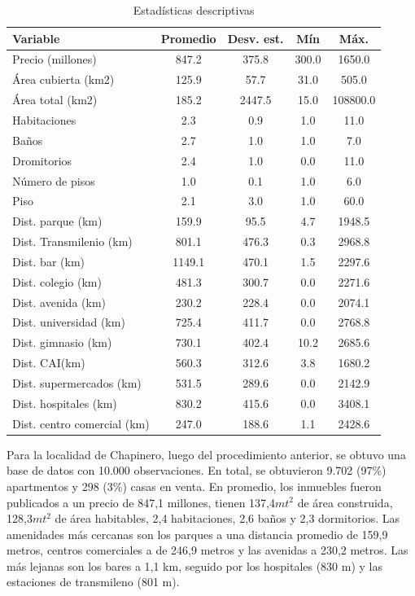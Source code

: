 \documentclass[
  11pt,
  letterpaper,
]{article}
\begin{document}
\begin{table}[!h]
\centering
\caption{\label{tab:descriptive-tbl}Estadísticas descriptivas}
\centering
\begin{tabular}[t]{l|c|c|c|c}
\hline
Variable & Promedio & Desv. est. & Mín & Máx.\\
\hline
Precio (millones) & 847.2 & 375.8 & 300.0 & 1650.0\\
\hline
Área cubierta (km2) & 125.9 & 57.7 & 31.0 & 505.0\\
\hline
Área total (km2) & 185.2 & 2447.5 & 15.0 & 108800.0\\
\hline
Habitaciones & 2.3 & 0.9 & 1.0 & 11.0\\
\hline
Baños & 2.7 & 1.0 & 1.0 & 7.0\\
\hline
Dromitorios & 2.4 & 1.0 & 0.0 & 11.0\\
\hline
Número de pisos & 1.0 & 0.1 & 1.0 & 6.0\\
\hline
Piso & 2.1 & 3.0 & 1.0 & 60.0\\
\hline
Dist. parque (km) & 159.9 & 95.5 & 4.7 & 1948.5\\
\hline
Dist. Transmilenio (km) & 801.1 & 476.3 & 0.3 & 2968.8\\
\hline
Dist. bar (km) & 1149.1 & 470.1 & 1.5 & 2297.6\\
\hline
Dist. colegio (km) & 481.3 & 300.7 & 0.0 & 2271.6\\
\hline
Dist. avenida (km) & 230.2 & 228.4 & 0.0 & 2074.1\\
\hline
Dist. universidad (km) & 725.4 & 411.7 & 0.0 & 2768.8\\
\hline
Dist. gimnasio (km) & 730.1 & 402.4 & 10.2 & 2685.6\\
\hline
Dist. CAI(km) & 560.3 & 312.6 & 3.8 & 1680.2\\
\hline
Dist. supermercados (km) & 531.5 & 289.6 & 0.0 & 2142.9\\
\hline
Dist. hospitales (km) & 830.2 & 415.6 & 0.0 & 3408.1\\
\hline
Dist. centro comercial (km) & 247.0 & 188.6 & 1.1 & 2428.6\\
\hline
\end{tabular}
\end{table}

Para la localidad de Chapinero, luego del procedimiento anterior, se obtuvo una base de datos con 10.000 observaciones. En total, se obtuvieron 9.702 (97\%) apartmentos y 298 (3\%) casas en venta. En promedio, los inmuebles fueron publicados a un precio de 847,1 millones, tienen 137,4\(mt^2\) de área construida, 128,3\(mt^2\) de área habitables, 2,4 habitaciones, 2,6 baños y 2,3 dormitorios. Las amenidades más cercanas son los parques a una distancia promedio de 159,9 metros, centros comerciales a de 246,9 metros y las avenidas a 230,2 metros. Las más lejanas son los bares a 1,1 km, seguido por los hospitales (830 m) y las estaciones de transmileno (801 m).
\end{document}
